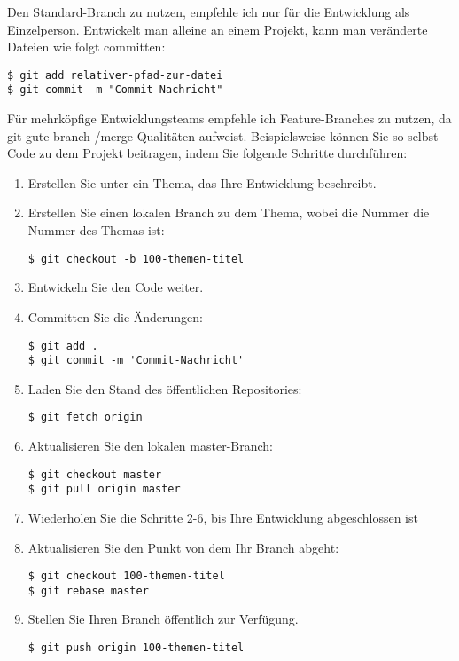 Den Standard-Branch zu nutzen, empfehle ich nur für die Entwicklung als Einzelperson. Entwickelt man alleine an einem Projekt, kann man veränderte Dateien wie folgt committen:
\begin{verbatim}
$ git add relativer-pfad-zur-datei
$ git commit -m "Commit-Nachricht"
\end{verbatim}

Für mehrköpfige Entwicklungsteams empfehle ich Feature-Branches zu nutzen, da \gls{git} gute branch-/merge-Qualitäten aufweist. Beispielsweise können Sie so selbst Code zu dem Projekt beitragen, indem Sie folgende Schritte durchführen:
\begin{enumerate}
\item Erstellen Sie unter  ein Thema, das Ihre Entwicklung beschreibt.

\item Erstellen Sie einen lokalen Branch zu dem Thema, wobei die Nummer die Nummer des Themas ist:
\begin{verbatim}
$ git checkout -b 100-themen-titel
\end{verbatim}

\item Entwickeln Sie den Code weiter.

\item Committen Sie die Änderungen:
\begin{verbatim}
$ git add .
$ git commit -m 'Commit-Nachricht'
\end{verbatim}

\item Laden Sie den Stand des öffentlichen Repositories:
\begin{verbatim}
$ git fetch origin
\end{verbatim}

\item Aktualisieren Sie den lokalen master-Branch:
\begin{verbatim}
$ git checkout master
$ git pull origin master
\end{verbatim}

\item Wiederholen Sie die Schritte 2-6, bis Ihre Entwicklung abgeschlossen ist

\item Aktualisieren Sie den Punkt von dem Ihr Branch abgeht:
\begin{verbatim}
$ git checkout 100-themen-titel
$ git rebase master
\end{verbatim}

\item Stellen Sie Ihren Branch öffentlich zur Verfügung.
\begin{verbatim}
$ git push origin 100-themen-titel
\end{verbatim}
\end{enumerate}

